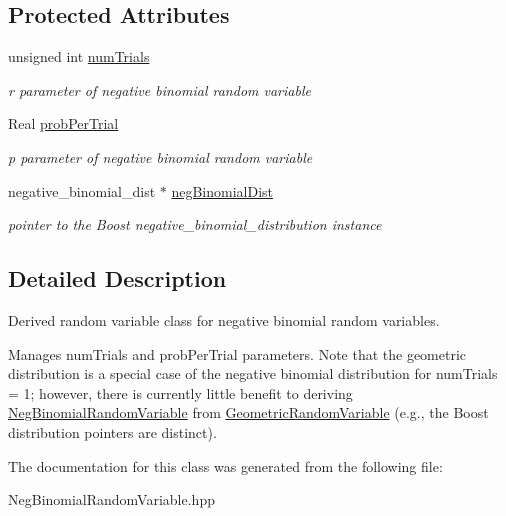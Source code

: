 \subsection*{Protected Attributes}
\begin{DoxyCompactItemize}
\item 
unsigned int \hyperlink{classPecos_1_1NegBinomialRandomVariable_ae7284c5049f25d6872f8fbe98c855e0c}{num\+Trials}\label{classPecos_1_1NegBinomialRandomVariable_ae7284c5049f25d6872f8fbe98c855e0c}

\begin{DoxyCompactList}\small\item\em r parameter of negative binomial random variable \end{DoxyCompactList}\item 
Real \hyperlink{classPecos_1_1NegBinomialRandomVariable_a034cce918fd6c1433e74212387527794}{prob\+Per\+Trial}\label{classPecos_1_1NegBinomialRandomVariable_a034cce918fd6c1433e74212387527794}

\begin{DoxyCompactList}\small\item\em p parameter of negative binomial random variable \end{DoxyCompactList}\item 
negative\+\_\+binomial\+\_\+dist $\ast$ \hyperlink{classPecos_1_1NegBinomialRandomVariable_a11407882148ec2a21c271c5001db9f4d}{neg\+Binomial\+Dist}\label{classPecos_1_1NegBinomialRandomVariable_a11407882148ec2a21c271c5001db9f4d}

\begin{DoxyCompactList}\small\item\em pointer to the Boost negative\+\_\+binomial\+\_\+distribution instance \end{DoxyCompactList}\end{DoxyCompactItemize}


\subsection{Detailed Description}
Derived random variable class for negative binomial random variables. 

Manages num\+Trials and prob\+Per\+Trial parameters. Note that the geometric distribution is a special case of the negative binomial distribution for num\+Trials = 1; however, there is currently little benefit to deriving \hyperlink{classPecos_1_1NegBinomialRandomVariable}{Neg\+Binomial\+Random\+Variable} from \hyperlink{classPecos_1_1GeometricRandomVariable}{Geometric\+Random\+Variable} (e.\+g., the Boost distribution pointers are distinct). 

The documentation for this class was generated from the following file\+:\begin{DoxyCompactItemize}
\item 
Neg\+Binomial\+Random\+Variable.\+hpp\end{DoxyCompactItemize}
